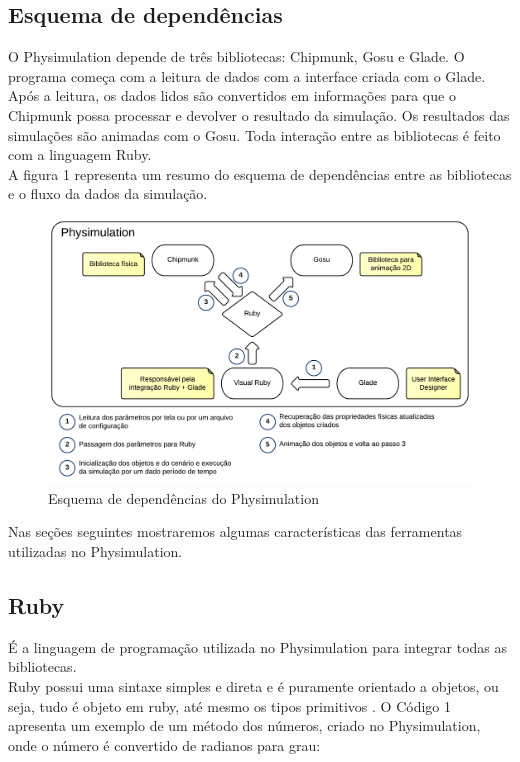 \subsection{Esquema de dependências}
O Physimulation depende de três bibliotecas: Chipmunk, Gosu e Glade. O programa começa com a leitura de dados com a interface criada com o Glade. Após a leitura, 
os dados lidos são convertidos em informações para que o Chipmunk possa processar e devolver o resultado da simulação. Os resultados das simulações são animadas 
com o Gosu. Toda interação entre as bibliotecas é feito com a linguagem Ruby. \\

A figura 1 representa um resumo do esquema de dependências entre as bibliotecas e o fluxo da dados da simulação.

\begin{figure}[!htbp]
  \includegraphics[scale=0.19]{EsquemaDependencia.png}
  \caption{Esquema de dependências do Physimulation}
\end{figure}

Nas seções seguintes mostraremos algumas características das ferramentas utilizadas no Physimulation.

\subsection{Ruby}
É a linguagem de programação utilizada no Physimulation para integrar todas as bibliotecas.\\

Ruby possui uma sintaxe simples e direta e é puramente orientado a objetos, ou seja, tudo é objeto em ruby, até mesmo os tipos primitivos \cite{ruby:caelum}. O Código 1 apresenta um exemplo de um método dos números, criado no Physimulation, onde o 
número é convertido de radianos para grau:


